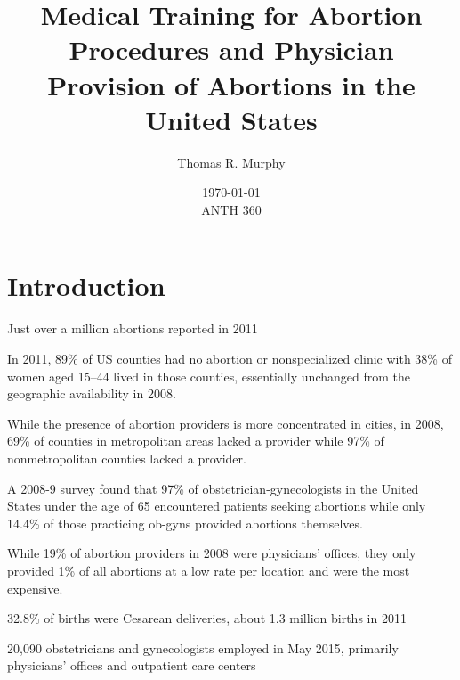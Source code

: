 \documentclass[letterpaper, 12pt]{article}
\title{Medical Training for Abortion Procedures and Physician Provision of Abortions in the United States}
\author{Thomas R. Murphy}
\date{\today\\ANTH 360}
\begin{document}
\maketitle


\section*{Introduction}


Just over a million abortions reported in 2011 \autocite[pg. 7]{jones_abortion_2014}

In 2011, 89\% of US counties had no abortion or nonspecialized clinic with 38\% of women aged 15–44 lived in those counties, essentially unchanged from the geographic availability in 2008. \autocite[pg. 7]{jones_abortion_2014}

While the presence of abortion providers is more concentrated in cities, in 2008, 69\% of counties in metropolitan areas lacked a provider while 97\% of nonmetropolitan counties lacked a provider. \autocite[pg 46]{jones_abortion_2011}

A 2008-9 survey found that 97\% of obstetrician-gynecologists in the United States under the age of 65 encountered patients seeking abortions while only 14.4\% of those practicing ob-gyns provided abortions themselves. \autocite[pg. 611]{stulberg_abortion_2011}

While 19\% of abortion providers in 2008 were physicians' offices, they only provided 1\% of all abortions at a low rate per location and were the most expensive. \autocite[pg. 46-7]{jones_abortion_2011}

32.8\% of births were Cesarean deliveries, about 1.3 million births in 2011 \autocite[pg. 5]{martin_births_2013}

20,090 obstetricians and gynecologists employed in May 2015, primarily physicians' offices and outpatient care centers \autocite{occupational_employment_and_wages_may_2015}
\end{document}
